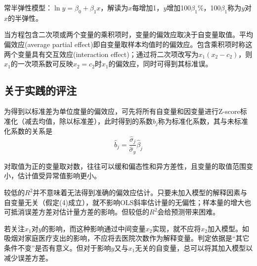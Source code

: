 \par 常半弹性模型：$\ln y=\beta_0+\beta_1 x$，解读为$x$每增加1，$y$增加100$\beta_1$\%，100$\beta_1$称为$y$对$x$的半弹性。

\par 当方程包含二次项或两个变量的乘积项时，变量的偏效应取决于自变量取值。平均偏效应(average partial effect)即自变量取样本均值时的偏效应。包含乘积项时称这两个变量具有交互效应(interaction effect)；通过将二次项改写为$x_1(x_2-c_2)$，则$x_1$的一次项系数可反映$x_2=c_2$时$x_1$的偏效应，同时可得到其标准误。

\subsection{关于实践的评注}
\par 为得到以标准差为单位度量的偏效应，可先将所有自变量和因变量进行Z-score标准化（减去均值，除以标准差），此时得到的系数$\hat{b}_j$称为标准化系数，其与未标准化系数的关系是
\begin{equation}
    \hat{b}_j=\frac{\hat{\sigma}_j}{\hat{\sigma}_y}\hat{\beta}_j
\end{equation}

\par 对取值为正的变量取对数，往往可以缓和偏态性和异方差性，且变量的取值范围变小，估计值受异常值影响更小。

\par 较低的$R^2$并不意味着无法得到准确的偏效应估计。只要未加入模型的解释因素与自变量无关（假定(4)成立），就不影响OLS斜率估计量的无偏性；样本量的增大也可抵消误差方差对估计量方差的影响。但较低的$R^2$会给预测带来困难。

\par 若关注$x_1$对$y$的影响，而这种影响通过中间变量$x_2$实现，就不应将$x_2$加入模型。如吸烟对家庭医疗支出的影响，不应将去医院次数作为解释变量。判定依据是“其它条件不变”是否有意义。但对于影响$y$又与$x_1$无关的自变量，总可以将其加入模型以减少误差方差。